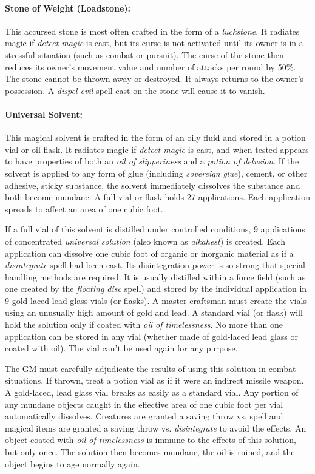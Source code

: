 \begin{multicols}{2}
\paragraph{Stone of Weight (Loadstone):} This accursed stone is most often crafted in the form of a \textit{luckstone}.  It radiates magic if \textit{detect magic} is cast, but its curse is not activated until its owner is in a stressful situation (such as combat or pursuit).  The curse of the stone then reduces its owner's movement value and number of attacks per round by 50\%.  The stone cannot be thrown away or destroyed.  It always returns to the owner's possession.  A \textit{dispel evil} spell cast on the stone will cause it to vanish.

\paragraph{Universal Solvent:} This magical solvent is crafted in the form of an oily fluid and stored in a potion vial or oil flask.  It radiates magic if \textit{detect magic} is cast, and when tested appears to have properties of both an \textit{oil of slipperiness} and a \textit{potion of delusion}.  If the solvent is applied to any form of glue (including \textit{sovereign glue}), cement, or other adhesive, sticky substance, the solvent immediately dissolves the substance and both become mundane.  A full vial or flask holds 27 applications.  Each application spreads to affect an area of one cubic foot.

If a full vial of this solvent is distilled under controlled conditions, 9 applications of concentrated \textit{universal solution} (also known as \textit{alkahest}) is created.  Each application can dissolve one cubic foot of organic or inorganic material as if a \textit{disintegrate} spell had been cast.  Its disintegration power is so strong that special handling methods are required.  It is usually distilled within a force field (such as one created by the \textit{floating disc} spell) and stored by the individual application in 9 gold-laced lead glass vials (or flasks).  A master craftsman must create the vials using an unusually high amount of gold and lead.  A standard vial (or flask) will hold the solution only if coated with \textit{oil of timelessness}.  No more than one application can be stored in any vial (whether made of gold-laced lead glass or coated with oil).  The vial can't be used again for any purpose.  

The GM must carefully adjudicate the results of using this solution in combat situations.  If thrown, treat a potion vial as if it were an indirect missile weapon.  A gold-laced, lead glass vial breaks as easily as a standard vial.  Any portion of any mundane objects caught in the effective area of one cubic foot per vial automatically dissolves.  Creatures are granted a saving throw vs. spell and magical items are granted a saving throw vs. \textit{disintegrate} to avoid the effects.  An object coated with \textit{oil of timelessness} is immune to the effects of this solution, but only once.  The solution then becomes mundane, the oil is ruined, and the object begins to age normally again.


\end{multicols}
